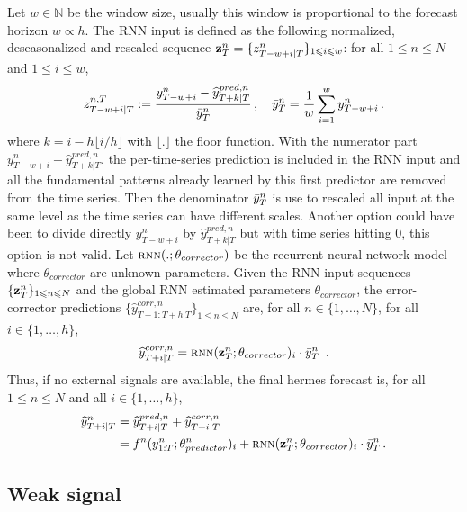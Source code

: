 \documentclass[10pt]{article} %
\newcommand{\ts}{y}
\newcommand{\tspred}{\widehat{\ts}}
\newcommand{\stat}{f}
\newcommand{\statparam}{\theta_{predictor}}
\newcommand{\lag}{h}
\newcommand{\window}{w}
\newcommand{\meants}{\Bar{\ts}}
\newcommand{\rnnwindow}{{\bf \rnninput}}
\newcommand{\rnninput}{z}
\newcommand{\rnn}{\textsc{rnn}}
\newcommand{\rnnparam}{\theta_{corrector}}
\begin{document}
Let $\window \in \mathbb{N}$ be the window size, usually this window is proportional to the forecast horizon $\window \propto \lag$. The RNN input is defined as the following  normalized, deseasonalized and rescaled sequence $\rnnwindow^n_T = \{\rnninput^{n}_{T-\window+i|T}\}_{1\leqslant i \leqslant w}$: for all $1\leqslant n \leqslant N$ and $1\leqslant i \leqslant w$,
$$
\rnninput^{n,T}_{T-w+i|T} := \frac{\ts^n_{T-w+i} -\tspred^{pred,n}_{T+k|T}}{\meants^n_T}\,,\quad \meants^n_T = \frac{1}{w}\sum_{i = 1}^{w}\ts^n_{T-w+i}\,.
$$
where $k = i - h\lfloor i/h \rfloor$ with $\lfloor. \rfloor$ the floor function. With the numerator part $\ts^n_{T-w+i} -\tspred^{pred,n}_{T+k|T}$, the per-time-series prediction is included in the RNN input and all the fundamental patterns already learned by this first predictor are removed from the time series. Then the denominator $\meants^n_T$ is use to rescaled all input at the same level as the time series can have different scales. Another option could have been to divide directly  $\ts^n_{T-w+i}$ by $\tspred^{pred,n}_{T+k|T}$ but with time series hitting 0, this option is not valid. Let $\rnn(.;\rnnparam)$ be the recurrent neural network model where $\rnnparam$ are  unknown parameters. Given the RNN input sequences $\{\rnnwindow^n_T\}_{1\leqslant n \leqslant N}$ and the global RNN estimated parameters $\rnnparam$, the error-corrector predictions $\{\tspred^{corr,n}_{T+1:T+\lag|T}\}_{1\leqslant n \leqslant N}$ are, for all $n \in \{1,\ldots,N\}$, for all $i \in \{1,\ldots,\lag\}$,
$$
\tspred^{corr,n}_{T+i|T} = \rnn(\rnnwindow^n_T;\rnnparam)_i \cdot \meants^n_T\ \,.
$$
Thus, if no external signals are available, the final hermes  forecast is, for all $1\leqslant n \leqslant N$ and all $i \in \{1,\ldots,\lag\}$,
\begin{align}
\label{eq:nows:full:model}
\tspred^n_{T+i|T}  &= \tspred^{pred,n}_{T+i|T} +  \tspred^{corr,n}_{T+i|T} \\
&= \stat^n(\ts^n_{1:T};\statparam^n)_i +  \rnn(\rnnwindow^n_T;\rnnparam)_i \cdot \meants^n_T\,.\nonumber
\end{align}


\subsection{Weak signal}
\end{document}
